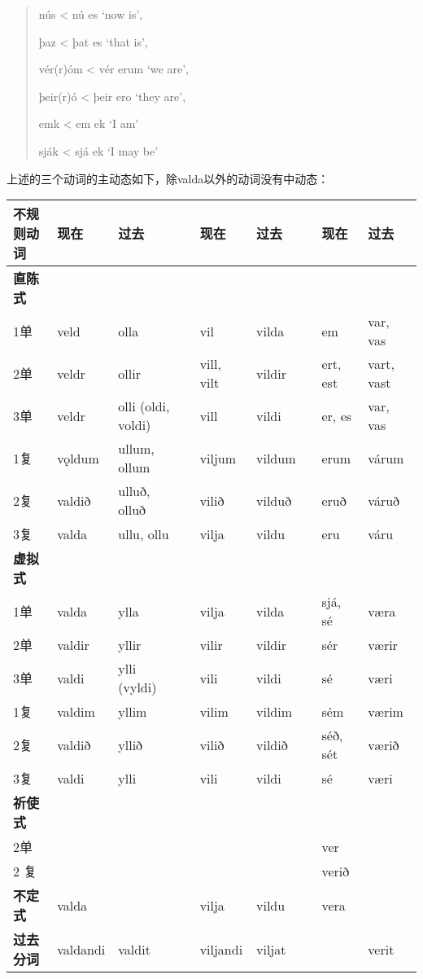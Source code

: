 \begin{quote}
nús \textless{} nú es `now is‌',

þaz \textless{} þat es `that is‌',

vér(r)óm \textless{} vér erum `we are‌',

þeir(r)ó \textless{} þeir ero `they are‌',

emk \textless{} em ek `I am'

sják \textless{} sjá ek `I may be'
\end{quote}

上述的三个动词的主动态如下，除valda以外的动词没有中动态：

\begin{longtable}{lllllllll}
\toprule
不规则动词 & 现在 & 过去 &  & 现在 & 过去 &  & 现在 & 过去 \\
\midrule
\endhead
\bottomrule
\endfoot
\textbf{直陈式} & & & & & & & & \\
1单 & veld & olla & & vil & vilda & & em & var, vas \\
2单 & veldr & ollir & & vill, vilt & vildir & & ert, est & vart, vast \\
3单 & veldr & olli (oldi, voldi) & & vill & vildi & & er, es & var,
vas \\
1复 & vǫldum & ullum, ollum & & viljum & vildum & & erum & várum \\
2复 & valdið & ulluð, olluð & & vilið & vilduð & & eruð & váruð \\
3复 & valda & ullu, ollu & & vilja & vildu & & eru & váru \\
\textbf{虚拟式} & & & & & & & & \\
1单 & valda & ylla & & vilja & vilda & & sjá, sé & væra \\
2单 & valdir & yllir & & vilir & vildir & & sér & værir \\
3单 & valdi & ylli (vyldi) & & vili & vildi & & sé & væri \\
1复 & valdim & yllim & & vilim & vildim & & sém & værim \\
2复 & valdið & yllið & & vilið & vildið & & séð, sét & værið \\
3复 & valdi & ylli & & vili & vildi & & sé & væri \\
\textbf{祈使式} & & & & & & & & \\
2单 & & & & & & & ver & \\
2 复 & & & & & & & verið & \\
\textbf{不定式} & valda & & & vilja & vildu & & vera & \\
\textbf{过去分词} & valdandi & valdit & & viljandi & viljat & & &
verit \\
\end{longtable}


